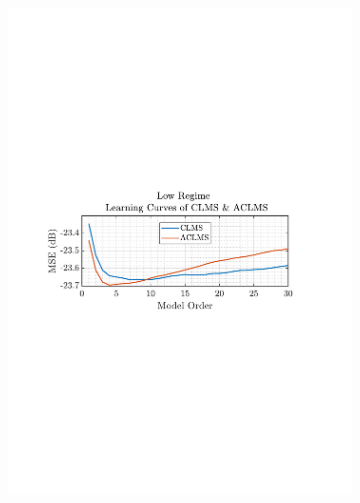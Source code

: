 \documentclass[12pt]{article}
\numberwithin{equation}{section}
\begin{document}
\begin{figure}[H]
\begin{subfigure}{0.49\textwidth}
					\includegraphics[trim={2.2cm 11.2cm 3.15cm  11.2cm}, clip, width=\textwidth]{../MATLAB/figures/q3_1b_fig05.pdf} 
				\end{subfigure}
				\begin{subfigure}{0.49\textwidth}
					\centering

\end{subfigure}
\end{figure}
\end{document}
